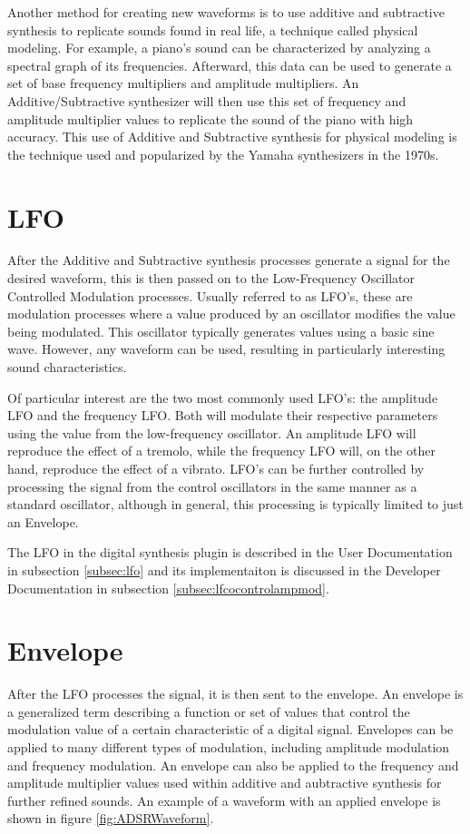 \documentclass[a4paper,12pt]{report}
\begin{document}
Another method for creating new waveforms is to use additive and subtractive synthesis to replicate sounds found in real life, a technique called physical modeling. For example, a piano's sound can be characterized by analyzing a spectral graph of its frequencies. Afterward, this data can be used to generate a set of base frequency multipliers and amplitude multipliers. An Additive/Subtractive synthesizer will then use this set of frequency and amplitude multiplier values to replicate the sound of the piano with high accuracy. This use of Additive and Subtractive synthesis for physical modeling is the technique used and popularized by the Yamaha synthesizers in the 1970s.

\section{LFO}
\label{sec:lfo}
After the Additive and Subtractive synthesis processes generate a signal for the desired waveform, this is then passed on to the Low-Frequency Oscillator Controlled Modulation processes. Usually referred to as LFO's, these are modulation processes where a value produced by an oscillator modifies the value being modulated. This oscillator typically generates values using a basic sine wave. However, any waveform can be used, resulting in particularly interesting sound characteristics.

Of particular interest are the two most commonly used LFO's: the amplitude LFO and the frequency LFO. Both will modulate their respective parameters using the value from the low-frequency oscillator. An amplitude LFO will reproduce the effect of a tremolo, while the frequency LFO will, on the other hand, reproduce the effect of a vibrato. LFO's can be further controlled by processing the signal from the control oscillators in the same manner as a standard oscillator, although in general, this processing is typically limited to just an Envelope.

The LFO in the digital synthesis plugin is described in the User Documentation in subsection \ref{subsec:lfo} and its implementaiton is discussed in the Developer Documentation in subsection \ref{subsec:lfcocontrolampmod}.

\section{Envelope}
\label{sec:env}
After the LFO processes the signal, it is then sent to the envelope. An envelope is a generalized term describing a function or set of values that control the modulation value of a certain characteristic of a digital signal. Envelopes can be applied to many different types of modulation, including amplitude modulation and frequency modulation. An envelope can also be applied to the frequency and amplitude multiplier values used within additive and aubtractive synthesis for further refined sounds. An example of a waveform with an applied envelope is shown in figure \ref{fig:ADSRWaveform}.
\end{document}
